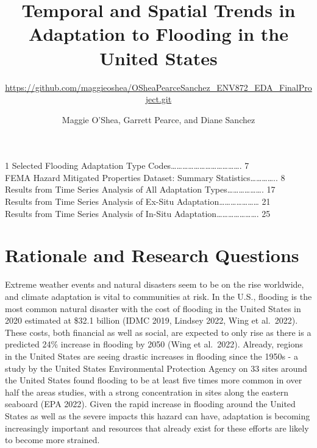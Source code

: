 \documentclass[
  12pt,
]{article}
\title{Temporal and Spatial Trends in Adaptation to Flooding in the
United States}
\subtitle{\url{https://github.com/maggieoshea/OSheaPearceSanchez_ENV872_EDA_FinalProject.git}}
\author{Maggie O'Shea, Garrett Pearce, and Diane Sanchez}
\date{}
\begin{document}
\maketitle

\newpage
\tableofcontents 
\newpage
\listoftables

1 Selected Flooding Adaptation Type
Codes\ldots\ldots\ldots\ldots\ldots\ldots\ldots\ldots\ldots\ldots\ldots\ldots.
7\\
 FEMA Hazard Mitigated Properties Dataset: Summary
Statistics\ldots\ldots\ldots\ldots.. 8\\
 Results from Time Series Analysis of All Adaptation
Types\ldots\ldots\ldots\ldots\ldots\ldots. 17\\
 Results from Time Series Analysis of Ex-Situ
Adaptation\ldots\ldots\ldots\ldots\ldots\ldots\ldots{} 21\\
 Results from Time Series Analysis of In-Situ
Adaptation\ldots\ldots\ldots\ldots\ldots\ldots\ldots. 25\\
\newpage

\listoffigures 
\newpage

\newpage

\hypertarget{rationale-and-research-questions}{%
\section{Rationale and Research
Questions}\label{rationale-and-research-questions}}

Extreme weather events and natural disasters seem to be on the rise
worldwide, and climate adaptation is vital to communities at risk. In
the U.S., flooding is the most common natural disaster with the cost of
flooding in the United States in 2020 estimated at \$32.1 billion (IDMC
2019, Lindsey 2022, Wing et al.~2022). These costs, both financial as
well as social, are expected to only rise as there is a predicted 24\%
increase in flooding by 2050 (Wing et al.~2022). Already, regions in the
United States are seeing drastic increases in flooding since the 1950s -
a study by the United States Environmental Protection Agency on 33 sites
around the United States found flooding to be at least five times more
common in over half the areas studies, with a strong concentration in
sites along the eastern seaboard (EPA 2022). Given the rapid increase in
flooding around the United States as well as the severe impacts this
hazard can have, adaptation is becoming increasingly important and
resources that already exist for these efforts are likely to become more
strained.
\end{document}

